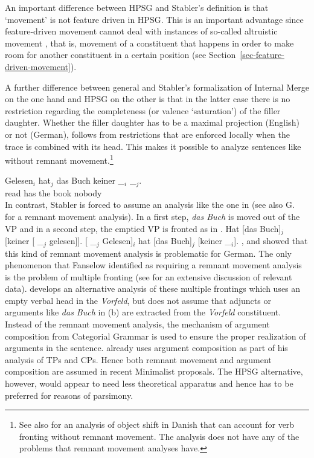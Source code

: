 An important difference between HPSG and Stabler's definition is that `movement' is not feature
driven in HPSG. This is an important advantage since feature-driven movement cannot deal with
instances of so-called altruistic movement \citep{Fanselow2003b}, that is, movement of a constituent that happens
in order to make room for another constituent in a certain position (see Section~\ref{sec-feature-driven-movement}).

A further difference between general \xbart and Stabler's formalization of Internal Merge on the
one hand and HPSG on the other is that in the latter case there is no restriction regarding the
completeness (or valence `saturation') of the filler daughter. Whether the filler daughter has to be
a maximal projection (English) or not (German),\pagebreak{} 
follows from restrictions that are enforced locally
when the trace is combined with its head. This makes it possible to analyze sentences like 
without remnant movement.\footnote{%
  See also  for an analysis of object shift in Danish that can account for verb
  fronting without remnant movement. The analysis does not have any of the problems that remnant
  movement analyses have.
}

\ea
\gll Gelesen$_i$ hat$_j$ das Buch keiner \_$_i$ \_$_j$.\\
     read        has     the book nobody\\
\z
In contrast, Stabler is forced to assume an analysis like the one in  (see also G.\
 for a remnant movement analysis). In a first step, \emph{das Buch} is moved out
of the VP \pmexa{1} and in a second step, the emptied VP is fronted as in \pmexb{1}.
\eal
\ex {}Hat [das Buch]$_j$ [keiner [ \_$_j$ gelesen]].
\ex {}[\sub{VP} \_$_j$ Gelesen]$_i$ hat [das Buch]$_j$ [keiner \_$_i$].
\zl
\citet[]{Haider93a}, %
\citet[Section~2]{dKM2001a} and \citet{Fanselow2002a} showed that this kind of remnant movement analysis is problematic for German. The
only phenomenon that Fanselow identified as requiring a remnant
movement analysis is the problem of multiple fronting
(see \citew{Mueller2003b} for an extensive discussion of relevant
data). \citet{Mueller2005c,Mueller2005d,MuellerGS} develops an alternative analysis of these multiple 
frontings which uses an empty verbal head in the \emph{Vorfeld}, but does not assume that
adjuncts or arguments like \emph{das Buch} in (\mex{0}b) are 
extracted from the \emph{Vorfeld} constituent. Instead of the remnant movement analysis, the
mechanism of argument composition from Categorial Grammar \citep{Geach70a,HN94a} is used to ensure the proper realization
of arguments in the sentence. \citet[\page 20]{Chomsky2007a} already uses argument composition as part of
his analysis of TPs and CPs. Hence both remnant movement and argument composition are assumed in
recent Minimalist proposals. The HPSG alternative, however,  would appear to need less theoretical
apparatus and hence has to be preferred for reasons of parsimony. 

